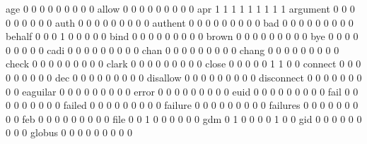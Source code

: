 \documentclass[compress,8pt]{beamer}
\begin{document}
\begin{frame}
\begin{Schunk}
  age                                        0   0   0   0   0   0   0   0   0
  allow                                      0   0   0   0   0   0   0   0   0
  apr                                        1   1   1   1   1   1   1   1   1
  argument                                   0   0   0   0   0   0   0   0   0
  auth                                       0   0   0   0   0   0   0   0   0
  authent                                    0   0   0   0   0   0   0   0   0
  bad                                        0   0   0   0   0   0   0   0   0
  behalf                                     0   0   0   1   0   0   0   0   0
  bind                                       0   0   0   0   0   0   0   0   0
  brown                                      0   0   0   0   0   0   0   0   0
  bye                                        0   0   0   0   0   0   0   0   0
  cadi                                       0   0   0   0   0   0   0   0   0
  chan                                       0   0   0   0   0   0   0   0   0
  chang                                      0   0   0   0   0   0   0   0   0
  check                                      0   0   0   0   0   0   0   0   0
  clark                                      0   0   0   0   0   0   0   0   0
  close                                      0   0   0   0   0   1   1   0   0
  connect                                    0   0   0   0   0   0   0   0   0
  dec                                        0   0   0   0   0   0   0   0   0
  disallow                                   0   0   0   0   0   0   0   0   0
  disconnect                                 0   0   0   0   0   0   0   0   0
  eaguilar                                   0   0   0   0   0   0   0   0   0
  error                                      0   0   0   0   0   0   0   0   0
  euid                                       0   0   0   0   0   0   0   0   0
  fail                                       0   0   0   0   0   0   0   0   0
  failed                                     0   0   0   0   0   0   0   0   0
  failure                                    0   0   0   0   0   0   0   0   0
  failures                                   0   0   0   0   0   0   0   0   0
  feb                                        0   0   0   0   0   0   0   0   0
  file                                       0   0   1   0   0   0   0   0   0
  gdm                                        0   1   0   0   0   0   1   0   0
  gid                                        0   0   0   0   0   0   0   0   0
  globus                                     0   0   0   0   0   0   0   0   0

\end{Schunk}
\end{frame}
\end{document}
